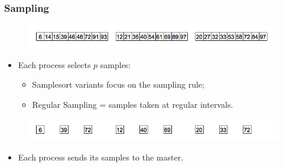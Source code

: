 \documentclass{beamer}
\begin{document}
\begin{frame}
	\frametitle{Sampling}
	\begin{figure}
		\begin{center}
			\includegraphics[width=\textwidth]{images/02localorder.png}
		\end{center}
	\end{figure}
	
	\pause
	\begin{itemize}
		\item{Each process selects $p$ samples:
		\begin{itemize}
			\item{Samplesort variants focus on the sampling rule;}
			\item{Regular Sampling = samples taken at regular intervals.}
		\end{itemize}
		}
	\end{itemize}
	
	\begin{figure}
		\begin{center}
			\includegraphics[width=\textwidth]{images/03sampling.png}
		\end{center}
	\end{figure}
	
	\pause
	\begin{itemize}
		\item{Each process sends its samples to the master.}
	\end{itemize}
\end{frame}
\end{document}
